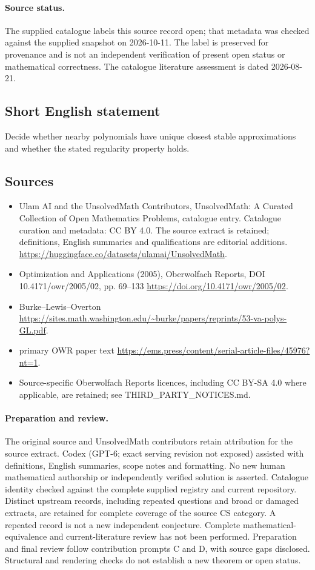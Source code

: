 \documentclass[11pt]{article}
\begin{document}
\paragraph{Source status.}
The supplied catalogue labels this source record open; that metadata was checked against the supplied snapshot on 2026-10-11. The label is preserved for provenance and is not an independent verification of present open status or mathematical correctness. The catalogue literature assessment is dated 2026-08-21.
\subsection{Short English statement}
Decide whether nearby polynomials have unique closest stable approximations and whether the stated regularity property holds.
\subsection{Sources}
\begin{itemize}
\item[S1] Ulam AI and the UnsolvedMath Contributors, UnsolvedMath: A Curated Collection of Open Mathematics Problems, catalogue entry. Catalogue curation and metadata: CC BY 4.0. The source extract is retained; definitions, English summaries and qualifications are editorial additions.
\url{https://huggingface.co/datasets/ulamai/UnsolvedMath}.
\item[S2] Optimization and Applications (2005), Oberwolfach Reports, DOI 10.4171/owr/2005/02, pp. 69--133
\url{https://doi.org/10.4171/owr/2005/02}.
\item[S3] Burke--Lewis--Overton
\url{https://sites.math.washington.edu/~burke/papers/reprints/53-va-polys-GL.pdf}.
\item[S4] primary OWR paper text
\url{https://ems.press/content/serial-article-files/45976?nt=1}.
\item Source-specific Oberwolfach Reports licences, including CC BY-SA 4.0 where applicable, are retained; see THIRD\_PARTY\_NOTICES.md.
\end{itemize}
\paragraph{Preparation and review.}
The original source and UnsolvedMath contributors retain attribution for the source extract. Codex (GPT-6; exact serving revision not exposed) assisted with definitions, English summaries, scope notes and formatting. No new human mathematical authorship or independently verified solution is asserted. Catalogue identity checked against the complete supplied registry and current repository. Distinct upstream records, including repeated questions and broad or damaged extracts, are retained for complete coverage of the source CS category. A repeated record is not a new independent conjecture. Complete mathematical-equivalence and current-literature review has not been performed. Preparation and final review follow contribution prompts C and D, with source gaps disclosed. Structural and rendering checks do not establish a new theorem or open status.
\label{end:statement}
\end{document}
